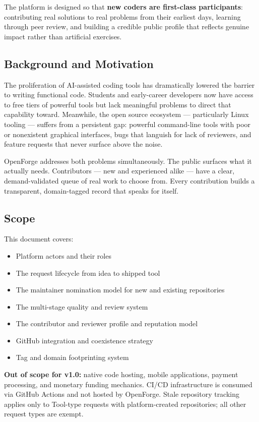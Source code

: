 \documentclass[12pt,a4paper]{article}
\begin{document}
The platform is designed so that \textbf{new coders are first-class participants}: contributing real solutions to real problems from their earliest days, learning through peer review, and building a credible public profile that reflects genuine impact rather than artificial exercises.

\subsection{Background and Motivation}
The proliferation of AI-assisted coding tools has dramatically lowered the barrier to writing functional code. Students and early-career developers now have access to free tiers of powerful tools but lack meaningful problems to direct that capability toward. Meanwhile, the open source ecosystem --- particularly Linux tooling --- suffers from a persistent gap: powerful command-line tools with poor or nonexistent graphical interfaces, bugs that languish for lack of reviewers, and feature requests that never surface above the noise.

OpenForge addresses both problems simultaneously. The public surfaces what it actually needs. Contributors --- new and experienced alike --- have a clear, demand-validated queue of real work to choose from. Every contribution builds a transparent, domain-tagged record that speaks for itself.

\subsection{Scope}
This document covers:
\begin{itemize}
  \item Platform actors and their roles
  \item The request lifecycle from idea to shipped tool
  \item The maintainer nomination model for new and existing repositories
  \item The multi-stage quality and review system
  \item The contributor and reviewer profile and reputation model
  \item GitHub integration and coexistence strategy
  \item Tag and domain footprinting system
\end{itemize}

\noindent\textbf{Out of scope for v1.0:} native code hosting, mobile applications, payment processing, and monetary funding mechanics. CI/CD infrastructure is consumed via GitHub Actions and not hosted by OpenForge. Stale repository tracking applies only to Tool-type requests with platform-created repositories; all other request types are exempt.
\end{document}
